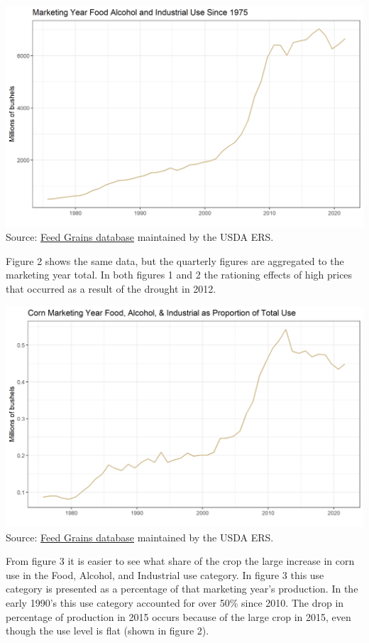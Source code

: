 \documentclass[
  letterpaper,
  DIV=11,
  numbers=noendperiod]{scrreprt}
\begin{document}
\includegraphics{assets/ForecastingUseof-CornUseCategoriesFoodAlcoholIndMY.png}
Source:
\href{http://www.ers.usda.gov/data-products/feed-grains-database/feed-grains-yearbook-tables.aspx\#26780}{Feed
Grains database} maintained by the USDA ERS.

Figure 2 shows the same data, but the quarterly figures are aggregated
to the marketing year total. In both figures 1 and 2 the rationing
effects of high prices that occurred as a result of the drought in 2012.

\includegraphics{assets/ForecastingUseof-CornUseCategoriesFoodAlcoholIndPropofUse.png}
Source:
\href{http://www.ers.usda.gov/data-products/feed-grains-database/feed-grains-yearbook-tables.aspx\#26780}{Feed
Grains database} maintained by the USDA ERS.

From figure 3 it is easier to see what share of the crop the large
increase in corn use in the Food, Alcohol, and Industrial use category.
In figure 3 this use category is presented as a percentage of that
marketing year's production. In the early 1990's this use category
accounted for over 50\% since 2010. The drop in percentage of production
in 2015 occurs because of the large crop in 2015, even though the use
level is flat (shown in figure 2).
\end{document}
